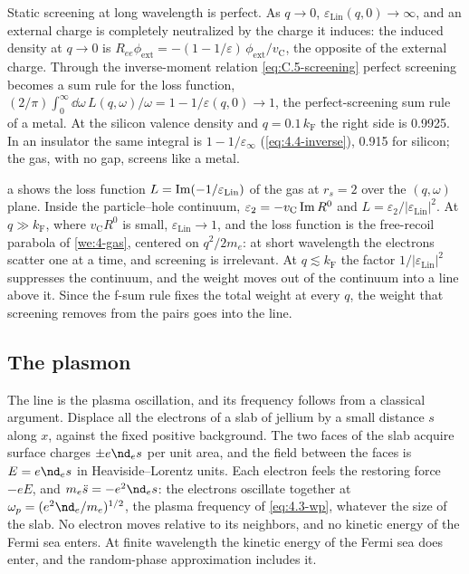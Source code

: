 Static screening at long wavelength is perfect. As $q \to 0$, $\varepsilon_{\mathrm{Lin}}(q, 0) \to \infty$, and an external charge is completely neutralized by the charge it induces: the induced density at $q \to 0$ is $R_{ee}\phi_{\mathrm{ext}} = -(1 - 1/\varepsilon)\,\phi_{\mathrm{ext}}/v_{\mathrm{C}}$, the opposite of the external charge. Through the inverse-moment relation \cref{eq:C.5-screening} perfect screening becomes a sum rule for the loss function, $(2/\pi)\int_0^\infty\dd\omega\,L(q,\omega)/\omega = 1 - 1/\varepsilon(q, 0) \to 1$, the perfect-screening sum rule of a metal. At the silicon valence density and $q = 0.1\,k_{\mathrm{F}}$ the right side is 0.9925. In an insulator the same integral is $1 - 1/\varepsilon_\infty$ (\cref{eq:4.4-inverse}), 0.915 for silicon; the gas, with no gap, screens like a metal.

a shows the loss function $L = \operatorname{Im}(-1/\varepsilon_{\mathrm{Lin}})$ of the gas at $r_s = 2$ over the $(q, \omega)$ plane. Inside the particle--hole continuum, $\varepsilon_2 = -v_{\mathrm{C}}\operatorname{Im} R^0$ and $L = \varepsilon_2/|\varepsilon_{\mathrm{Lin}}|^2$. At $q \gg k_{\mathrm{F}}$, where $v_{\mathrm{C}}R^0$ is small, $\varepsilon_{\mathrm{Lin}} \to 1$, and the loss function is the free-recoil parabola of \cref{we:4-gas}, centered on $q^2/2m_e$: at short wavelength the electrons scatter one at a time, and screening is irrelevant. At $q \lesssim k_{\mathrm{F}}$ the factor $1/|\varepsilon_{\mathrm{Lin}}|^2$ suppresses the continuum, and the weight moves out of the continuum into a line above it. Since the f-sum rule fixes the total weight at every $q$, the weight that screening removes from the pairs goes into the line.

\subsection{The plasmon}

The line is the plasma oscillation, and its frequency follows from a classical argument. Displace all the electrons of a slab of jellium by a small distance $s$ along $x$, against the fixed positive background. The two faces of the slab acquire surface charges $\pm e\nd_es$ per unit area, and the field between the faces is $E = e\nd_es$ in Heaviside--Lorentz units. Each electron feels the restoring force $-eE$, and $m_e\ddot s = -e^2\nd_es$: the electrons oscillate together at $\omega_p = (e^2\nd_e/m_e)^{1/2}$, the plasma frequency of \cref{eq:4.3-wp}, whatever the size of the slab. No electron moves relative to its neighbors, and no kinetic energy of the Fermi sea enters. At finite wavelength the kinetic energy of the Fermi sea does enter, and the random-phase approximation includes it.

